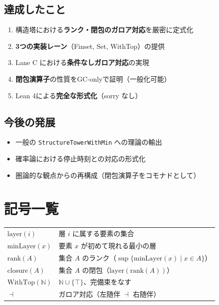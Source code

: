 \documentclass[a4paper,11pt]{ltjsarticle}
\theoremstyle{definition}
\newcommand{\N}{\mathbb{N}}
\newcommand{\layer}{\mathrm{layer}}
\newcommand{\rank}{\mathrm{rank}}
\newcommand{\closure}{\mathrm{closure}}
\newcommand{\minLayer}{\mathrm{minLayer}}
\newcommand{\WithTop}{\mathrm{WithTop}}
\begin{document}
\subsection{達成したこと}

\begin{enumerate}
  \item 構造塔における\textbf{ランク・閉包のガロア対応}を厳密に定式化
  \item \textbf{3つの実装レーン}（Finset, Set, WithTop）の提供
  \item Lane C における\textbf{条件なしガロア対応}の実現
  \item \textbf{閉包演算子}の性質をGC-onlyで証明（一般化可能）
  \item Lean 4による\textbf{完全な形式化}（sorry なし）
\end{enumerate}

\subsection{今後の発展}

\begin{itemize}
  \item 一般の \texttt{StructureTowerWithMin} への理論の輸出
  \item 確率論における停止時刻との対応の形式化
  \item 圏論的な観点からの再構成（閉包演算子をコモナドとして）
\end{itemize}

\appendix
\section{記号一覧}

\begin{tabular}{ll}
$\layer(i)$ & 層 $i$ に属する要素の集合 \\
$\minLayer(x)$ & 要素 $x$ が初めて現れる最小の層 \\
$\rank(A)$ & 集合 $A$ のランク（$\sup \{\minLayer(x) \mid x \in A\}$）\\
$\closure(A)$ & 集合 $A$ の閉包（$\layer(\rank(A))$）\\
$\WithTop(\N)$ & $\N \cup \{\top\}$、完備束をなす \\
$\dashv$ & ガロア対応（左随伴 $\dashv$ 右随伴）\\
\end{tabular}
\end{document}
